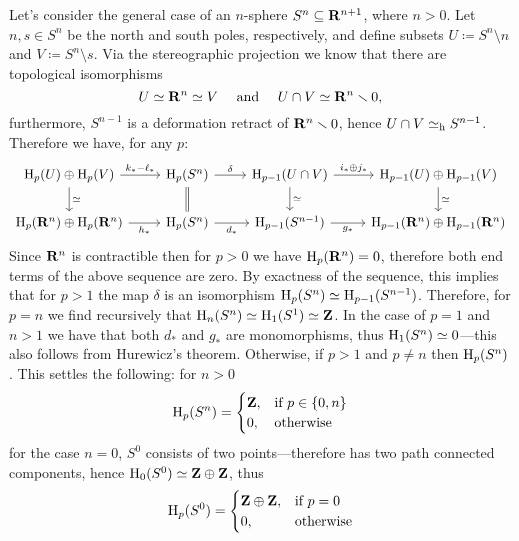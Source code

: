 \begin{example}[\(n\)-spheres]
\label{exp:homology-of-sphere}
Let's consider the general case of an \(n\)-sphere \(S^n \subseteq \mathbf{R}^{n+1}\), where
\(n > 0\). Let \(n, s \in S^n\) be the north and south poles, respectively, and
define subsets \(U \coloneq S^n \setminus n\) and
\(V \coloneq S^n \setminus s\). Via the stereographic projection we know that there are
topological isomorphisms
\[
U \simeq \mathbf{R}^n \simeq V \quad \text{ and } \quad U \cap V \simeq \mathbf{R}^n \smallsetminus 0,
\]
furthermore, \(S^{n-1}\) is a deformation retract of \(\mathbf{R}^n \smallsetminus 0\), hence
\(U \cap V \simeq_{\text{h}} S^{n-1}\). Therefore we have, for any \(p\):
\[
\begin{tikzcd}
\Hmlg_p(U) \oplus \Hmlg_p(V) \ar[r, "k_{*} - \ell_{*}"]
\ar[d, "\dis"]
&\Hmlg_p(S^n) \ar[r, "\delta"]
\ar[d, equals]
&\Hmlg_{p-1}(U \cap V) \ar[r, "i_{*} \oplus j_{*}"]
\ar[d, "\dis"]
&\Hmlg_{p-1}(U) \oplus \Hmlg_{p-1}(V)
\ar[d, "\dis"]
\\
\Hmlg_p(\R^n) \oplus \Hmlg_p(\R^n) \ar[r, "h_{*}"']
&\Hmlg_p(S^n) \ar[r, "d_{*}"']
&\Hmlg_{p-1}(S^{n-1}) \ar[r, "g_{*}"']
&\Hmlg_{p-1}(\R^n) \oplus \Hmlg_{p-1}(\R^n)
\end{tikzcd}
\]
Since \(\mathbf{R}^n\) is contractible then for \(p > 0\) we have \(\operatorname{H}_p(\mathbf{R}^n) = 0\),
therefore both end terms of the above sequence are zero. By exactness of the
sequence, this implies that for \(p > 1\) the map \(\delta\) is an isomorphism
\(\operatorname{H}_p(S^n) \simeq \operatorname{H}_{p-1}(S^{n-1})\). Therefore, for \(p = n\) we find
recursively that \(\operatorname{H}_n(S^n) \simeq \operatorname{H}_1(S^1) \simeq \mathbf{Z}\). In the case of
\(p = 1\) and \(n > 1\) we have that both \(d_{*}\) and \(g_{*}\) are
monomorphisms, thus \(\operatorname{H}_1(S^n) \simeq 0\)---this also follows from Hurewicz's
theorem. Otherwise, if \(p > 1\) and \(p \neq n\) then \(\operatorname{H}_p(S^n)\). This
settles the following: for \(n > 0\)
\[
\operatorname{H}_p(S^n) =
\begin{cases}
  \mathbf{Z}, &\text{if } p \in \{0, n\} \\
  0,  &\text{otherwise}
\end{cases}
\]
for the case \(n = 0\), \(S^0\) consists of two points---therefore has two path
connected components, hence \(\operatorname{H}_0(S^0) \simeq \mathbf{Z} \oplus \mathbf{Z}\), thus
\[
\operatorname{H}_p(S^0) =
\begin{cases}
  \mathbf{Z} \oplus \mathbf{Z}, &\text{if } p = 0 \\
  0,       &\text{otherwise}
\end{cases}
\]
\end{example}

